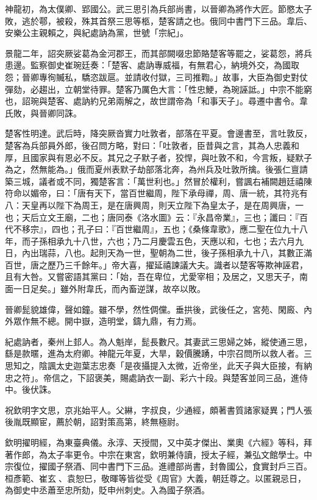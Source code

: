\begin{pinyinscope}
 神龍初，為太僕卿、郢國公。武三思引為兵部尚書，以晉卿為將作大匠。節愍太子敗，逃於鄠，被殺，殊其首祭三思等柩，楚客請之也。俄同中書門下三品。韋后、安樂公主親賴之，與紀處訥為黨，世號「宗紀」。



 景龍二年，詔突厥娑葛為金河郡王，而其部闕啜忠節賂楚客等罷之，娑葛怨，將兵患邊。監察御史崔琬廷奏：「楚客、處訥專威福，有無君心，納境外交，為國取怨；晉卿專徇贓私，驕恣跋扈。並請收付獄，三司推鞫。」故事，大臣為御史對仗彈劾，必趨出，立朝堂待罪。楚客乃厲色大言：「性忠鯁，為琬誣詆。」中宗不能窮也，詔琬與楚客、處訥約兄弟兩解之，故世謂帝為「和事天子」。尋遷中書令。韋氏敗，與晉卿同誅。



 楚客性明達。武后時，降突厥沓實力吐敦者，部落在平夏。會邊書至，言吐敦反，楚客為兵部員外郎，後召問方略，對曰：「吐敦者，臣昔與之言，其為人忠義和厚，且國家與有恩必不反。其兄之子默子者，狡悍，與吐敦不和，今言叛，疑默子為之，然無能為。」俄而夏州表默子劫部落北奔，為州兵及吐敦所擒。後張仁亶請築三城，議者或不同，獨楚客言：「萬世利也。」然冒於權利，嘗諷右補闕趙廷禧陳符命以媚帝，曰：「唐有天下，當百世繼周，陛下承母禪，周、唐一統，其符兆有八：天皇再以陛下為周王，是在唐興周，則天立陛下為皇太子，是在周興唐，一也；天后立文王廟，二也；唐同泰《洛水圖》云：『永昌帝業』，三也；讖曰：『百代不移宗』，四也；孔子曰：『百世繼周』，五也；《桑條韋歌》，應二聖在位九十八年，而子孫相承九十八世，六也；乃二月慶雲五色，天應以和，七也；去六月九日，內出瑞蒜，八也。起則天為一世，聖朝為二世，後子孫相承九十八，其數正滿百世，唐之歷乃三千餘年。」帝大喜，擢延禧諫議大夫。識者以楚客等欺神誣君，且有大咎。又嘗密語其黨曰：「始，吾在卑位，尤愛宰相；及居之，又思天子，南面一日足矣。」雖外附韋氏，而內畜逆謀，故卒以敗。



 晉卿髭貌雄偉，聲如鐘。雖不學，然性倜儻。垂拱後，武後任之，宮苑、閑廄、內外眾作無不總。開中嶽，造明堂，鑄九鼎，有力焉。



 紀處訥者，秦州上邽人。為人魁岸，髭長數尺。其妻武三思婦之姊，縱使通三思，繇是款暱，進為太府卿。神龍元年夏，大旱，穀價騰踴，中宗召問所以救人者。三思知之，陰諷太史迦葉志忠奏「是夜攝提入太微，近帝坐，此天子與大臣接，有納忠之符」。帝信之，下詔褒美，賜處訥衣一副、彩六十段。與楚客並同三品，進侍中。後伏誅。



 祝欽明字文思，京兆始平人。父綝，字叔良，少通經，頗著書質諸家疑異；門人張後胤既顯宦，薦於朝，詔對策高第，終無極尉。



 欽明擢明經，為東臺典儀。永淳、天授間，又中英才傑出、業奧《六經》等科，拜著作郎，為太子率更令。中宗在東宮，欽明兼侍讀，授太子經，兼弘文館學士。中宗復位，擢國子祭酒、同中書門下三品。進禮部尚書，封魯國公，食實封戶三百。桓彥範、崔玄、袁恕巳，敬暉等皆從受《周官》大義，朝廷尊之。以匿親忌日，為御史中丞蕭至忠所劾，貶申州刺史。入為國子祭酒。




\end{pinyinscope}
